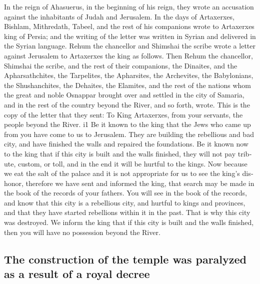 \begin{paracol}{2}
\begin{otherlanguage}{english}
 In the reign of Ahasuerus, in the beginning of his reign,
they wrote an accusation against the inhabitants of Judah and Jerusalem.
 In the days of Artaxerxes, Bishlam, Mithredath, Tabeel,
and the rest of his companions wrote to Artaxerxes king of Persia; and
the writing of the letter was written in Syrian and delivered in the
Syrian language.  Rehum the chancellor and Shimshai the
scribe wrote a letter against Jerusalem to Artaxerxes the king as
follows.  Then Rehum the chancellor, Shimshai the scribe,
and the rest of their companions, the Dinaites, and the Apharsathchites,
the Tarpelites, the Apharsites, the Archevites, the Babylonians, the
Shushanchites, the Dehaites, the Elamites,  and the rest
of the nations whom the great and noble Osnappar brought over and
settled in the city of Samaria, and in the rest of the country beyond
the River, and so forth, wrote.  This is the copy of the
letter that they sent: To King Artaxerxes, from your servants, the
people beyond the River. i1  Be it known to the king that
the Jews who came up from you have come to us to Jerusalem. They are
building the rebellious and bad city, and have finished the walls and
repaired the foundations.  Be it known now to the king
that if this city is built and the walls finished, they will not pay
tribute, custom, or toll, and in the end it will be hurtful to the
kings.  Now because we eat the salt of the palace and it
is not appropriate for us to see the king's dishonor, therefore we have
sent and informed the king,  that search may be made in
the book of the records of your fathers. You will see in the book of the
records, and know that this city is a rebellious city, and hurtful to
kings and provinces, and that they have started rebellions within it in
the past. That is why this city was destroyed.  We inform
the king that if this city is built and the walls finished, then you
will have no possession beyond the River.

\hypertarget{the-construction-of-the-temple-was-paralyzed-as-a-result-of-a-royal-decree}{%
\subsection{The construction of the temple was paralyzed as a result of
a royal
decree}\label{the-construction-of-the-temple-was-paralyzed-as-a-result-of-a-royal-decree}}


\end{otherlanguage}
\end{paracol}
